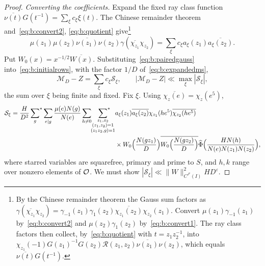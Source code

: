 \begin{proof}
\emph{Converting the coefficients.} Expand the fixed ray class function $\overline{\nu(t)}G(t^{-1})=\sum_\xi c_\xi\xi(t)$. The Chinese remainder theorem and~\eqref{eq:b:convert2}, \eqref{eq:b:quotient} give\footnote{By the Chinese remainder theorem the Gauss sum factors as $\gamma(\overline{\chi_{z_1}}\chi_{z_2})=\gamma_{-1}(z_1)\gamma_1(z_2)\overline{\chi_{z_1}(z_2)}\chi_{z_2}(z_1)$. Convert $\mu(z_1)\gamma_{-1}(z_1)$ by~\eqref{eq:b:convert2} and $\mu(z_2)\gamma_1(z_2)$ by~\eqref{eq:b:convert1}. The ray class factors then collect, by~\eqref{eq:b:quotient} with $t=z_1z_2^{-1}$, into $\chi_{z_1}(-1)G(z_1)^{-1}G(z_2)\mathcal R(z_1,z_2)\overline{\nu(z_1)}\nu(z_2)$, which equals $\overline{\nu(t)}G(t^{-1})$.}
\begin{equation}\label{eq:b:pairedgauss}
  \mu(z_1)\mu(z_2)\overline{\nu(z_1)}\nu(z_2)\gamma(\overline{\chi_{z_1}}\chi_{z_2})=\sum_\xi c_\xi a_\xi(z_1)\overline{a_\xi(z_2)}.
\end{equation}
Put $W_0(x)=x^{-1/2}\overline{W(x)}$. Substituting~\eqref{eq:b:pairedgauss} into~\eqref{eq:b:initialrows}, with the factor $1/D$ of~\eqref{eq:b:expandedms},
\[
  \mathcal M_D-Z=\sum_\xi c_\xi\mathcal S_\xi,\qquad|\mathcal M_D-Z|\ll\max_\xi|\mathcal S_\xi|,
\]
the sum over $\xi$ being finite and fixed. Fix $\xi$. Using $\overline{\chi_z(e)}=\chi_z(e^5)$,
\[
\begin{aligned}
  \mathcal S_\xi=\frac H{D^2}\sideset{}{^*}\sum_g\sum_{e\mid g}\frac{\mu(e)N(g)}{N(e)}\sum_{h\ne0}\sideset{}{^*}\sum_{\substack{z_1,z_2\\(z_1,z_2)=1\\(z_1z_2,g)=1}}&a_\xi(z_1)\overline{a_\xi(z_2)}\chi_{z_1}(he^5)\overline{\chi_{z_2}(he^5)}\\
  &\times W_0\Bigl(\frac{N(gz_1)}D\Bigr)\overline{W_0\Bigl(\frac{N(gz_2)}D\Bigr)}\widehat\Phi\Bigl(\frac{HN(h)}{N(e)N(z_1)N(z_2)}\Bigr),
\end{aligned}
\]
where starred variables are squarefree, primary and prime to $S$, and $h,k$ range over nonzero elements of $\mathcal{O}$. We must show $|\mathcal S_\xi|\ll\|W\|^2_{C^{J'}(I)}HD^\varepsilon$.


\end{proof}
